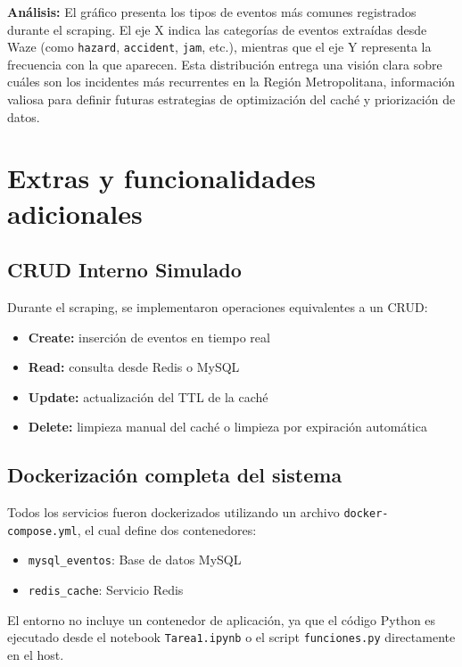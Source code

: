 \documentclass[12pt]{article}
\begin{document}
\textbf{Análisis:} El gráfico presenta los tipos de eventos más comunes registrados durante el scraping. El eje X indica las categorías de eventos extraídas desde Waze (como \texttt{hazard}, \texttt{accident}, \texttt{jam}, etc.), mientras que el eje Y representa la frecuencia con la que aparecen. Esta distribución entrega una visión clara sobre cuáles son los incidentes más recurrentes en la Región Metropolitana, información valiosa para definir futuras estrategias de optimización del caché y priorización de datos.


\section{Extras y funcionalidades adicionales}

\subsection{CRUD Interno Simulado}

Durante el scraping, se implementaron operaciones equivalentes a un CRUD:

\begin{itemize}
    \item \textbf{Create:} inserción de eventos en tiempo real
    \item \textbf{Read:} consulta desde Redis o MySQL
    \item \textbf{Update:} actualización del TTL de la caché
    \item \textbf{Delete:} limpieza manual del caché o limpieza por expiración automática
\end{itemize}

\subsection{Dockerización completa del sistema}

Todos los servicios fueron dockerizados utilizando un archivo \texttt{docker-compose.yml}, el cual define dos contenedores:

\begin{itemize}
    \item \texttt{mysql\_eventos}: Base de datos MySQL
    \item \texttt{redis\_cache}: Servicio Redis
\end{itemize}

El entorno no incluye un contenedor de aplicación, ya que el código Python es ejecutado desde el notebook \texttt{Tarea1.ipynb} o el script \texttt{funciones.py} directamente en el host.
\end{document}
